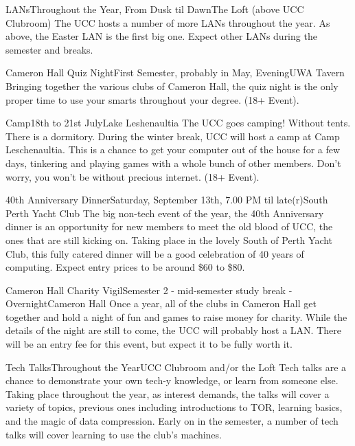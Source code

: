 \begin{event}{LANs}{Throughout the Year, From Dusk til Dawn}{The Loft (above UCC Clubroom)}
The UCC hosts a number of more LANs throughout the year. As above, the Easter LAN is the first big one. Expect other LANs during the semester and breaks.
\end{event}

\begin{event}{Cameron Hall Quiz Night}{First Semester, probably in May, Evening}{UWA Tavern}
Bringing together the various clubs of Cameron Hall, the quiz night is the only proper time to use your smarts throughout your degree.  (18+ Event).
\end{event}

\begin{event}{Camp}{18th to 21st July}{Lake Leshenaultia}
The UCC goes camping! Without tents. There is a dormitory. During the winter break, UCC will host a camp at Camp Leschenaultia. This is a chance to get your computer out of the house for a few days, tinkering and playing games with a whole bunch of other members. Don't worry, you won't be without precious internet. (18+ Event).
\end{event}

\begin{event}{40th Anniversary Dinner}{Saturday, September 13th, 7.00 PM til late(r)}{South Perth Yacht Club}
The big non-tech event of the year, the 40th Anniversary dinner is an opportunity for new members to meet the old blood of UCC, the ones that are still kicking on. Taking place in the lovely South of Perth Yacht Club, this fully catered dinner will be a good celebration of 40 years of computing. Expect entry prices to be around \$60 to \$80.
\end{event}

\begin{event}{Cameron Hall Charity Vigil}{Semester 2 - mid-semester study break - Overnight}{Cameron Hall}
Once a year, all of the clubs in Cameron Hall get together and hold a night of fun and games to raise money for charity. While the details of the night are still to come, the UCC will probably host a LAN. There will be an entry fee for this event, but expect it to be fully worth it.
\end{event}

\begin{event}{Tech Talks}{Throughout the Year}{UCC Clubroom and/or the Loft}
Tech talks are a chance to demonstrate your own tech-y knowledge, or learn from someone else. Taking place throughout the year, as interest demands, the talks will cover a variety of topics, previous ones including introductions to TOR, learning basics, and the magic of data compression. Early on in the semester, a number of tech talks will cover learning to use the club's machines.
\end{event}



